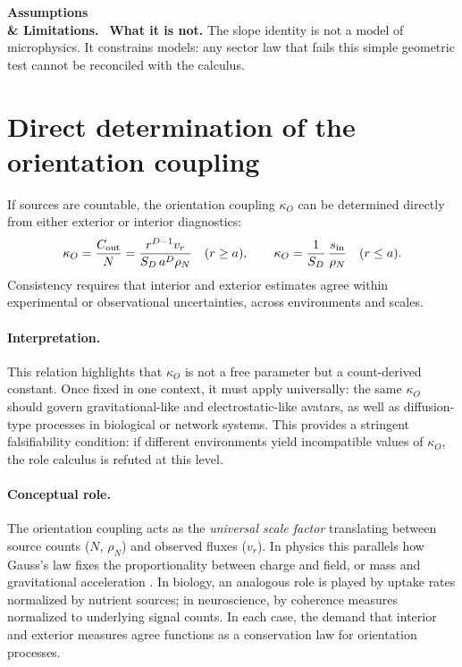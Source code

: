 \documentclass[12pt,a4paper,oneside]{scrreprt}
\newenvironment{limitation}{\par\vspace{0.5em}\noindent\textbf{Assumptions \\ \& Limitations.}\ }{\par\vspace{0.5em}}
\begin{document}
\begin{limitation}
\textbf{What it is not.} 
The slope identity is not a model of microphysics. 
It constrains models: any sector law that fails this simple geometric test 
cannot be reconciled with the calculus.
\end{limitation}


\section{Direct determination of the orientation coupling}\label{sec:ur-kappa}

If sources are countable, the orientation coupling $\kappa_O$ can be determined directly from either 
exterior or interior diagnostics:
\begin{equation}
\kappa_O = \frac{C_{\rm out}}{N} 
= \frac{r^{D-1} v_r}{S_D \, a^{D} \rho_N} \quad (r \ge a),
\qquad 
\kappa_O = \frac{1}{S_D} \, \frac{s_{\rm in}}{\rho_N} \quad (r \le a).
\end{equation}
Consistency requires that interior and exterior estimates agree within experimental or 
observational uncertainties, across environments and scales. 

\paragraph{Interpretation.} 
This relation highlights that $\kappa_O$ is not a free parameter but a 
count-derived constant. 
Once fixed in one context, it must apply universally: the same $\kappa_O$ 
should govern gravitational-like and electrostatic-like avatars, as well as 
diffusion-type processes in biological or network systems. 
This provides a stringent falsifiability condition: if different environments 
yield incompatible values of $\kappa_O$, the role calculus is refuted at this level. 

\paragraph{Conceptual role.} 
The orientation coupling acts as the \emph{universal scale factor} translating 
between source counts ($N$, $\rho_N$) and observed fluxes ($v_r$). 
In physics this parallels how Gauss’s law fixes the proportionality between 
charge and field, or mass and gravitational acceleration \citep{Jackson1999Classical}. 
In biology, an analogous role is played by uptake rates normalized by nutrient 
sources; in neuroscience, by coherence measures normalized to underlying 
signal counts. 
In each case, the demand that interior and exterior measures agree functions as 
a conservation law for orientation processes. 
\end{document}
